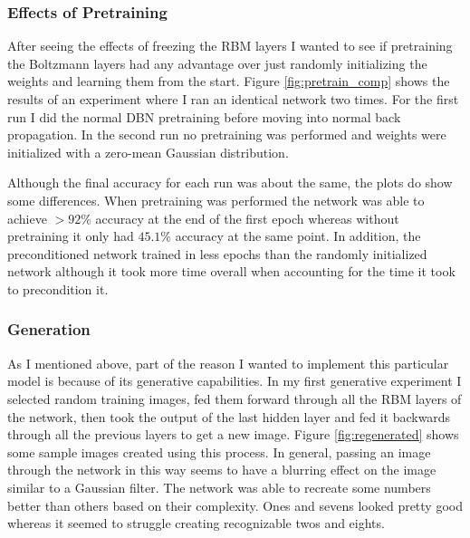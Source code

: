 \documentclass{article}
\begin{document}
	\subsubsection{Effects of Pretraining}
	After seeing the effects of freezing the RBM layers I wanted to see if pretraining the Boltzmann layers had any advantage over just randomly initializing the weights and learning them from the start.
	Figure \ref{fig:pretrain_comp} shows the results of an experiment where I ran an identical network two times. For the first run I did the normal DBN pretraining before moving into normal back propagation. In the second run no pretraining was performed and weights were initialized with a zero-mean Gaussian distribution. 	
	
	Although the final accuracy for each run was about the same, the plots do show some differences. When pretraining was performed the network was able to achieve $>92\%$ accuracy at the end of the first epoch whereas without pretraining it only had $45.1\%$ accuracy at the same point. In addition, the preconditioned network trained in less epochs than the randomly initialized network although it took more time overall when accounting for the time it took to precondition it.
	
	
	 
	\subsubsection{Generation}
	As I mentioned above, part of the reason I wanted to implement this particular model is because of its generative capabilities. In my first generative experiment I selected random training images, fed them forward through all the RBM layers of the network, then took the output of the last hidden layer and fed it backwards through all the previous layers to get a new image. Figure \ref{fig:regenerated} shows some sample images created using this process. In general, passing an image through the network in this way seems to have a blurring effect on the image similar to a Gaussian filter. The network was able to recreate some numbers better than others based on their complexity. Ones and sevens looked pretty good whereas it seemed to struggle creating recognizable twos and eights.    
	
\end{document}
